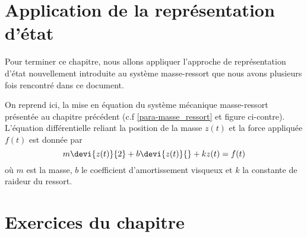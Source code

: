 \section{Application de la représentation d'état}
Pour terminer ce chapitre, nous allons appliquer l'approche de représentation
d'état nouvellement introduite au système masse-ressort que nous avons 
plusieurs fois rencontré dans ce document. 

On reprend ici, la mise en équation du système mécanique masse-ressort 
présentée au chapitre précédent (c.f \cref{para-masse_ressort} et figure 
ci-contre). L'équation différentielle reliant la position de la masse $z(t)$ et 
la force appliquée $f(t)$ est donnée par 
\[
m\devi{z(t)}{2}+b\devi{z(t)}{}+kz(t)=f(t)
\]
où $m$ est la masse, $b$ le coefficient d'amortissement visqueux et $k$ la
constante de raideur du ressort. 
\begin{marginfigure}
    \centering
    
\end{marginfigure}
\newpage
\restoregeometry
\captionsetup{width=0.9\linewidth}
\section{Exercices du chapitre}
\small

\setcounter{numexos}{0}
\normalsize
\newpage
\restoregeometry
\captionsetup{width=0.9\linewidth}
